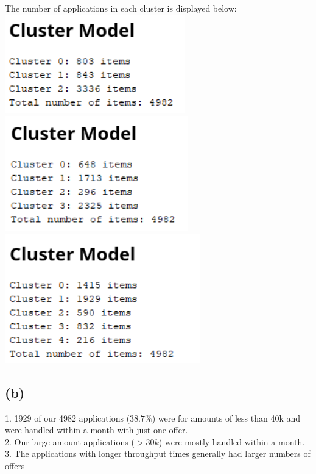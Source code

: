 \documentclass[../../main.tex]{subfiles}
\begin{document}
The number of applications in each cluster is displayed below:\\
\includegraphics[width=\textwidth/3]{img/QUESTION_3a_kmeans_3_cluster_sizes.png}
\includegraphics[width=\textwidth/3]{img/QUESTION_3a_kmeans_4_cluster_sizes.png}
\includegraphics[width=\textwidth/3]{img/QUESTION_3a_kmeans_5_cluster_sizes.png}

\subsection*{(b)}
1. 1929 of our 4982 applications ($38.7\%$) were for amounts of less than 40k and were handled within a month with just one offer.\\
2. Our large amount applications ($>30k$) were mostly handled within a month.\\
3. The applications with longer throughput times generally had larger numbers of offers
\end{document}
